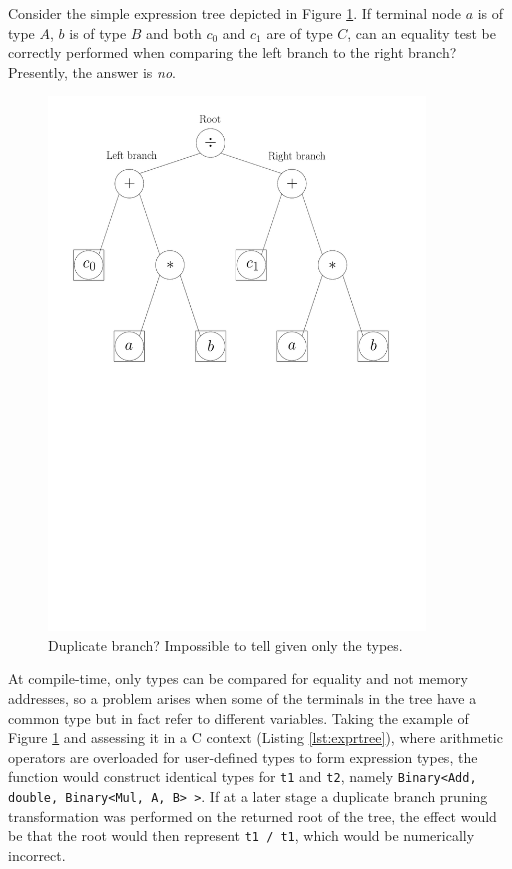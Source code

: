 \documentclass[a4paper,10pt]{article}
\def\CC{{C\nolinebreak[4]\hspace{-.05em}\raisebox{.4ex}{\tiny\bf ++}}}
\begin{document}
Consider the simple expression tree depicted in Figure \ref{fig:exprtree}. If terminal node $a$ is of type $A$, $b$ is of type $B$ and both $c_0$ and $c_1$ are of type $C$, can an equality test be correctly performed when comparing the left branch to the right branch? Presently, the answer is \emph{no}.
\begin{figure}[H]
 \centering
 \includegraphics[width=10cm]{fig_exprtree}
 \caption{Duplicate branch? Impossible to tell given only the types.}
 \label{fig:exprtree}
\end{figure}

At compile-time, only types can be compared for equality and not memory addresses, so a problem arises when some of the terminals in the tree have a common type but in fact refer to different variables. Taking the example of Figure \ref{fig:exprtree} and assessing it in a {\CC} context (Listing \ref{lst:exprtree}), where arithmetic operators are overloaded for user-defined types to form expression types, the function would construct identical types for \texttt{t1} and \texttt{t2}, namely  \texttt{Binary<Add, double, Binary<Mul, A, B> >}. If at a later stage a duplicate branch pruning transformation was performed on the returned root of the tree, the effect would be that the root would then represent \texttt{t1 / t1}, which would be numerically incorrect.
\end{document}

